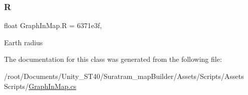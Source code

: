 \subsubsection{\texorpdfstring{R}{R}}
{\footnotesize\ttfamily float Graph\+In\+Map.\+R = 6371e3f\hspace{0.3cm}{\ttfamily [static]}, {\ttfamily [private]}}



Earth radius



The documentation for this class was generated from the following file\+:\begin{DoxyCompactItemize}
\item 
/root/\+Documents/\+Unity\+\_\+\+S\+T40/\+Suratram\+\_\+map\+Builder/\+Assets/\+Scripts/\+Assets Scripts/\hyperlink{GraphInMap_8cs}{Graph\+In\+Map.\+cs}\end{DoxyCompactItemize}
